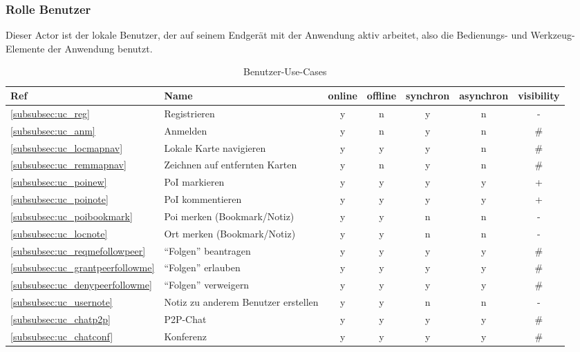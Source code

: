 \subsubsection{Rolle \textbf{Benutzer}}
Dieser Actor ist der lokale Benutzer, der auf seinem Endgerät mit der Anwendung aktiv arbeitet, also die Bedienungs- und Werkzeug-Elemente der Anwendung benutzt.\\
	\begin{table}[H]\label{usecases-benutzer}
		\centering
		\begin{tabulary}{\linewidth}{|>{\centering}m{1cm}|L|C|C|C|C|C|}
		\hline
			\textbf{Ref} & \textbf{Name} & \textbf{online} & \textbf{offline} & \textbf{synchron} & \textbf{asynchron} & \textbf{visibility} \\ \hline
			\ref{subsubsec:uc_reg} & Registrieren & y & n & y & n & - \\ \hline
			\ref{subsubsec:uc_anm} & Anmelden & y & n & y & n & \# \\ \hline
			\ref{subsubsec:uc_locmapnav} & Lokale Karte navigieren & y & y & y & n & \# \\ \hline
			\ref{subsubsec:uc_remmapnav} & Zeichnen auf entfernten Karten & y & n & y & n & \# \\ \hline
			\ref{subsubsec:uc_poinew} & PoI markieren & y & y & y & y & + \\ \hline
			\ref{subsubsec:uc_poinote} & PoI kommentieren & y & y & y & y & + \\ \hline
			\ref{subsubsec:uc_poibookmark} & Poi merken (Bookmark/Notiz) & y & y & n & n & - \\ \hline
			\ref{subsubsec:uc_locnote} & Ort merken (Bookmark/Notiz) & y & y & n & n & - \\ \hline
			\ref{subsubsec:uc_reqmefollowpeer} & "`Folgen"' beantragen & y & y & y & y & \# \\ \hline
			\ref{subsubsec:uc_grantpeerfollowme} & "`Folgen"' erlauben & y & y & y & y & \# \\ \hline
			\ref{subsubsec:uc_denypeerfollowme} & "`Folgen"' verweigern & y & y & y & y & \# \\ \hline
			\ref{subsubsec:uc_usernote} & Notiz zu anderem Benutzer erstellen & y & y & n & n & - \\ \hline
			\ref{subsubsec:uc_chatp2p} & P2P-Chat & y & y & y & y & \# \\ \hline
			\ref{subsubsec:uc_chatconf} & Konferenz & y & y & y & y & \# \\ \hline
		\end{tabulary}
	\caption{Benutzer-Use-Cases}
	\end{table}
